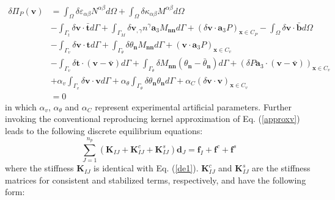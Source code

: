 \begin{equation}
\begin{split}
\delta \Pi_P(\boldsymbol v) &= \int_\Omega\delta \varepsilon_{\alpha\beta} N^{\alpha\beta} d\Omega +
\int_\Omega \delta \kappa_{\alpha\beta}M^{\alpha\beta} d\Omega \\
                     &- \int_{\Gamma_t} \delta \boldsymbol v \cdot \bar{\boldsymbol t} d\Gamma 
                     + \int_{\Gamma_M} \delta \boldsymbol v_{,\gamma} n^\gamma \boldsymbol a_3 M_{\boldsymbol{nn}} d\Gamma
                     + (\delta \boldsymbol v \cdot \boldsymbol a_3 P)_{\boldsymbol x \in C_P}
                     - \int_\Omega \delta \boldsymbol v \cdot \bar{\boldsymbol b} d\Omega \\
                     &- \int_{\Gamma_v} \delta \boldsymbol v \cdot \boldsymbol t d\Gamma 
                     + \int_{\Gamma_\theta} \delta \theta_{\boldsymbol n} M_{\boldsymbol{nn}}d\Gamma 
                     + (\boldsymbol v \cdot \boldsymbol a_3 P)_{\boldsymbol x \in C_v}\\
                     &- \int_{\Gamma_v} \delta \boldsymbol t \cdot (\boldsymbol v - \bar{\boldsymbol v}) d\Gamma
                     + \int_{\Gamma_\theta} \delta M_{\boldsymbol{nn}}(\theta_{\boldsymbol n} - \bar \theta_{\boldsymbol n})d\Gamma
                     + (\delta P\boldsymbol a_3 \cdot (\boldsymbol v - \bar{\boldsymbol v}))_{\boldsymbol x \in C_v} \\
                     &+ \alpha_v \int_{\Gamma_v} \delta \boldsymbol v \cdot \boldsymbol v d\Gamma 
                     + \alpha_\theta \int_{\Gamma_\theta} \delta \theta_{\boldsymbol n}\theta_{\boldsymbol n} d\Gamma
                     + \alpha_C(\delta \boldsymbol v \cdot \boldsymbol v)_{\boldsymbol x\in C_v} \\
                     &= 0
\end{split}
\end{equation}
in which $\alpha_v$, $\alpha_\theta$ and $\alpha_C$ represent experimental artificial parameters. Further invoking the conventional reproducing kernel approximation of Eq. (\ref{approxv}) leads to the following discrete equilibrium equations:
\begin{equation}
\sum_{J=1}^{n_p}(\boldsymbol K_{IJ} + \boldsymbol K^c_{IJ} + \boldsymbol K^s_{IJ}) \boldsymbol d_J = \boldsymbol f_I + \boldsymbol f^c + \boldsymbol f^s
\end{equation}
where the stiffness $\boldsymbol K_{IJ}$ is identical with Eq. (\ref{de1}). $\boldsymbol K^c_{IJ}$ and $\boldsymbol K^s_{IJ}$ are the stiffness matrices for consistent and stabilized terms, respectively, and have the following form:
